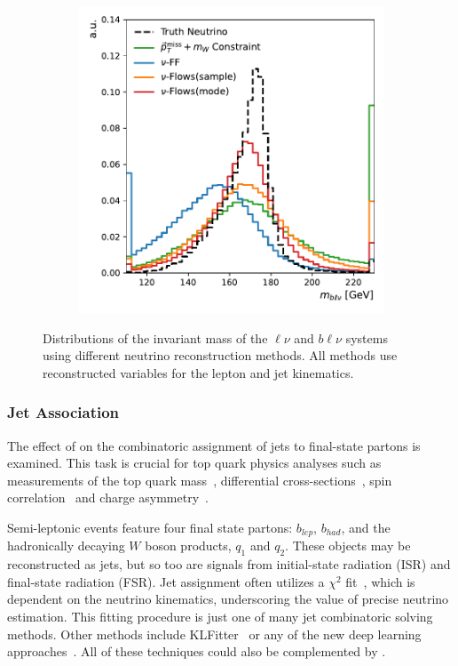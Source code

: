 \begin{figure}[htp]
\begin{subfigure}{0.40\textwidth}
        \includegraphics[width=\textwidth]{Figures/neutrino_unfolding/blnu_mass.pdf}
        \caption{} \label{fig:blv_mass}
    \end{subfigure}
    \caption{Distributions of the invariant mass of the $\ell\nu$  and $b\ell\nu$  systems using different neutrino reconstruction methods. All methods use reconstructed variables for the lepton and jet kinematics.}
    \label{fig:real_assoc_masses}
\end{figure}

\subsubsection{Jet Association}

The effect of \vflows on the combinatoric assignment of jets to final-state partons is examined.
This task is crucial for top quark physics analyses such as measurements of the top quark mass~\cite{ATLAS:2015pfy,CMS:2018quc,ATLAS:2018fwq,ATLAS:2019guf}, differential cross-sections~\cite{CMS:2016oae,CMS:2018htd,Quad4,CMS:2021vhb}, spin correlation~\cite{CMS:2015cal} and charge asymmetry~\cite{ATLAS:2022waa}.

Semi-leptonic \ttbar events feature four final state partons: $b_{lep}$, $b_{had}$, and the hadronically decaying $W$ boson products, $q_1$ and $q_2$.
These objects may be reconstructed as jets, but so too are signals from initial-state radiation (ISR) and final-state radiation (FSR).
Jet assignment often utilizes a $\chi^2$ fit~\cite{Chi2ATLAS}, which is dependent on the neutrino kinematics, underscoring the value of precise neutrino estimation.
This fitting procedure is just one of many jet combinatoric solving methods.
Other methods include KLFitter~\cite{KLFitter} or any of the new deep learning approaches~\cite{SAJA, SPANet, Spatter, TopoGraphs}.
All of these techniques could also be complemented by \vflows.

